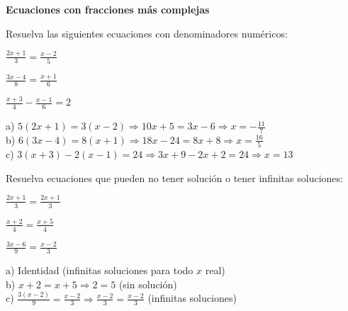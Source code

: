 \begin{exercise}
\textbf{Ecuaciones con fracciones más complejas}

\problem Resuelva las siguientes ecuaciones con denominadores numéricos:
\begin{exerciselist}
    \item $\frac{2x+1}{3} = \frac{x-2}{5}$
    \item $\frac{3x-4}{8} = \frac{x+1}{6}$
    \item $\frac{x+3}{4} - \frac{x-1}{6} = 2$
\end{exerciselist}

\begin{solucion}
a) $5(2x+1) = 3(x-2) \Rightarrow 10x+5 = 3x-6 \Rightarrow x = -\frac{11}{7}$\\
b) $6(3x-4) = 8(x+1) \Rightarrow 18x-24 = 8x+8 \Rightarrow x = \frac{16}{5}$\\
c) $3(x+3) - 2(x-1) = 24 \Rightarrow 3x+9-2x+2 = 24 \Rightarrow x = 13$
\end{solucion}

\problem Resuelva ecuaciones que pueden no tener solución o tener infinitas soluciones:
\begin{exerciselist}
    \item $\frac{2x+1}{3} = \frac{2x+1}{3}$
    \item $\frac{x+2}{4} = \frac{x+5}{4}$
    \item $\frac{3x-6}{9} = \frac{x-2}{3}$
\end{exerciselist}

\begin{solucion}
a) Identidad (infinitas soluciones para todo $x$ real)\\
b) $x+2 = x+5 \Rightarrow 2 = 5$ (sin solución)\\
c) $\frac{3(x-2)}{9} = \frac{x-2}{3} \Rightarrow \frac{x-2}{3} = \frac{x-2}{3}$ (infinitas soluciones)
\end{solucion}
\end{exercise}

